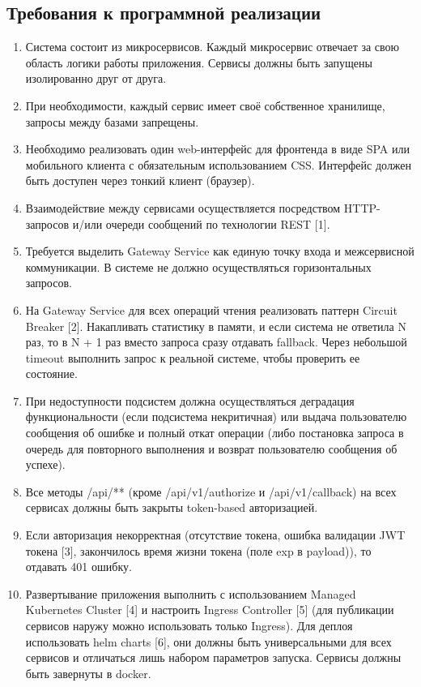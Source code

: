 \documentclass[a4paper, 12pt]{article}
\begin{document}
\begin{large}
\subsection{Требования к программной реализации}
\begin{enumerate}
	\item Система состоит из микросервисов. Каждый микросервис отвечает за свою область логики работы приложения. Сервисы должны быть запущены изолированно друг от друга.
	\item При необходимости, каждый сервис имеет своё собственное хранилище, запросы между базами запрещены.
	\item Необходимо реализовать один web-интерфейс для фронтенда в виде SPA или мобильного клиента с обязательным использованием CSS.  Интерфейс  должен  быть  доступен  через  тонкий  клиент (браузер).
	\item Взаимодействие между сервисами осуществляется посредством HTTP-запросов и/или очереди сообщений по технологии REST [1].
	\item Требуется выделить Gateway Service как единую точку входа и межсервисной коммуникации. В системе не должно осуществляться горизонтальных запросов.
	\item На Gateway Service для всех операций чтения реализовать паттерн Circuit Breaker [2]. Накапливать статистику в памяти, и если система не ответила N раз, то в N + 1 раз вместо запроса сразу отдавать fallback. Через небольшой timeout выполнить запрос к реальной системе, чтобы проверить ее состояние.
	\item При недоступности подсистем должна осуществляться деградация функциональности (если подсистема некритичная) или выдача пользователю сообщения об ошибке и полный откат операции (либо постановка запроса в очередь для повторного выполнения и возврат пользователю сообщения об успехе).
	\item Все методы /api/** (кроме /api/v1/authorize и /api/v1/callback) на всех сервисах должны быть закрыты token-based авторизацией.
	\item Если авторизация некорректная (отсутствие токена, ошибка валидации JWT токена [3], закончилось время жизни токена (поле exp в payload)), то отдавать 401 ошибку.
	\item Развертывание приложения выполнить с использованием Managed Kubernetes Cluster [4] и настроить Ingress Controller [5] (для публикации сервисов наружу можно использовать только Ingress). Для деплоя использовать helm charts [6], они должны быть универсальными для всех сервисов и отличаться лишь набором параметров запуска. Сервисы должны быть завернуты в docker.
\end{enumerate}


\end{large}
\end{document}
